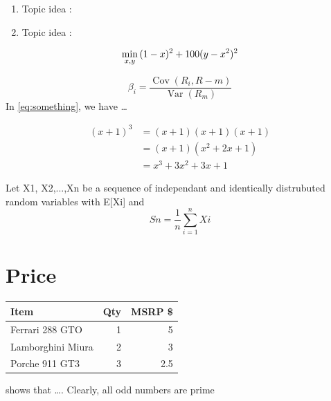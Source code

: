 \documentclass{article}
\begin{document}
\begin {enumerate}
\item Topic idea : 
\item Topic idea : 
\end {enumerate}




\begin{equation}
\label {eq:something} 
\min_{x,y} { (1-x)^2 + 100(y-x^2)^2}\\
\end{equation} 

\begin{equation*} %
\beta_i = 
\frac{\operatorname{Cov} (R_i, R-m)}
	{\operatorname{Var} (R_m)}
\end{equation*} 
In \eqref{eq:something}, we have \ldots


\begin{align*}
(x+1)^3 &= (x+1)(x+1)(x+1) \\
&= (x+1)(x^2 + 2x + 1) \\
&= x^3 + 3x^2 + 3x + 1
\end{align*}

Let X{1}, X{2},...,Xn be a sequence of independant and identically distrubuted random variables with E[X{i}] and 
\begin{equation*}
S{n}=
\frac{1}
	{n}
\sum_{i=1}^{n} X{i}
\end{equation*}


\section {Price}

\begin{tabular}{|l|r|r|} \hline%
Item                       & Qty      &     MSRP \$ \\\hline
Ferrari 288 GTO      & 1         &      5     \\\hline

Lamborghini Miura   &2          &      3      \\

Porche 911 GT3       &3          &      2.5    \\\hline
\end{tabular}
\cite{Brooks1997Methodology}
shows that \ldots. Clearly,
all odd numbers are prime


\end{document}
